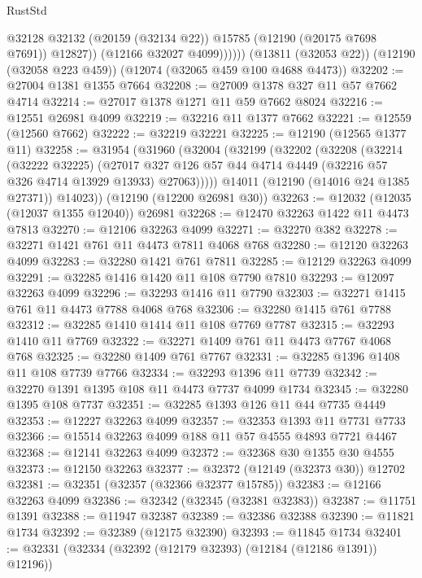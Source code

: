 \begin{lexlean}{RustStd}
\begin{coremodule}
                  @32128
                  @32132
                  (@20159 (@32134 @22))
                  @15785
                  (@12190 (@20175 @7698 @7691))
                  @12827))
              (@12166 @32027 @4099))))))
    (@13811 (@32053 @22))
    (@12190 (@32058 @223 @459))
    (@12074 (@32065 @459 @100 @4688 @4473))
@32202 := @27004 @1381 @1355 @7664
@32208 := @27009 @1378 @327 @11 @57 @7662 @4714
@32214 := @27017 @1378 @1271 @11 @59 @7662 @8024
@32216 := @12551 @26981 @4099
@32219 := @32216 @11 @1377 @7662
@32221 := @12559 (@12560 @7662)
@32222 := @32219 @32221
@32225 := @12190 (@12565 @1377 @11)
@32258 := @31954
    (@31960
      (@32004
        (@32199
          (@32202
            (@32208
              (@32214
                (@32222 @32225)
                (@27017
                  @327
                  @126
                  @57
                  @44
                  @4714
                  @4449
                  (@32216 @57 @326 @4714 @13929 @13933)
                  @27063)))))
        @14011
        (@12190 (@14016 @24 @1385 @27371))
        @14023))
    (@12190 (@12200 @26981 @30))
@32263 := @12032 (@12035 (@12037 @1355 @12040)) @26981
@32268 := @12470 @32263 @1422 @11 @4473 @7813
@32270 := @12106 @32263 @4099
@32271 := @32270 @382
@32278 := @32271 @1421 @761 @11 @4473 @7811 @4068 @768
@32280 := @12120 @32263 @4099
@32283 := @32280 @1421 @761 @7811
@32285 := @12129 @32263 @4099
@32291 := @32285 @1416 @1420 @11 @108 @7790 @7810
@32293 := @12097 @32263 @4099
@32296 := @32293 @1416 @11 @7790
@32303 := @32271 @1415 @761 @11 @4473 @7788 @4068 @768
@32306 := @32280 @1415 @761 @7788
@32312 := @32285 @1410 @1414 @11 @108 @7769 @7787
@32315 := @32293 @1410 @11 @7769
@32322 := @32271 @1409 @761 @11 @4473 @7767 @4068 @768
@32325 := @32280 @1409 @761 @7767
@32331 := @32285 @1396 @1408 @11 @108 @7739 @7766
@32334 := @32293 @1396 @11 @7739
@32342 := @32270 @1391 @1395 @108 @11 @4473 @7737 @4099 @1734
@32345 := @32280 @1395 @108 @7737
@32351 := @32285 @1393 @126 @11 @44 @7735 @4449
@32353 := @12227 @32263 @4099
@32357 := @32353 @1393 @11 @7731 @7733
@32366 := @15514 @32263 @4099 @188 @11 @57 @4555 @4893 @7721 @4467
@32368 := @12141 @32263 @4099
@32372 := @32368 @30 @1355 @30 @4555
@32373 := @12150 @32263
@32377 := @32372 (@12149 (@32373 @30)) @12702
@32381 := @32351 (@32357 (@32366 @32377 @15785))
@32383 := @12166 @32263 @4099
@32386 := @32342 (@32345 (@32381 @32383))
@32387 := @11751 @1391
@32388 := @11947 @32387
@32389 := @32386 @32388
@32390 := @11821 @1734
@32392 := @32389 (@12175 @32390)
@32393 := @11845 @1734
@32401 := @32331 (@32334 (@32392 (@12179 @32393) (@12184 (@12186 @1391)) @12196))

\end{coremodule}
\end{lexlean}
